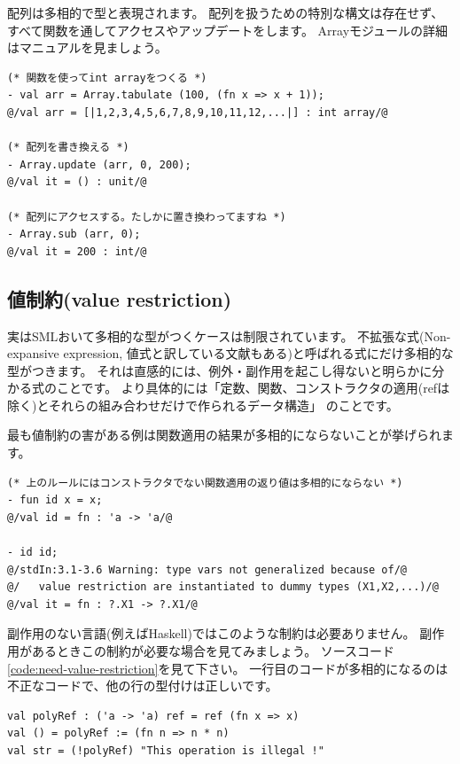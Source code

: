 \documentclass[11pt,a4paper]{jarticle}
\begin{document}
配列は多相的で型と表現されます。
配列を扱うための特別な構文は存在せず、
すべて関数を通してアクセスやアップデートをします。
Arrayモジュールの詳細はマニュアルを見ましょう\cite{sml-libs}。

\begin{lstlisting}[caption=配列の扱い,label=code:array]
(* 関数を使ってint arrayをつくる *)
- val arr = Array.tabulate (100, (fn x => x + 1));
@/val arr = [|1,2,3,4,5,6,7,8,9,10,11,12,...|] : int array/@

(* 配列を書き換える *)
- Array.update (arr, 0, 200);
@/val it = () : unit/@

(* 配列にアクセスする。たしかに置き換わってますね *)
- Array.sub (arr, 0);
@/val it = 200 : int/@
\end{lstlisting}

\subsection{値制約(value restriction)}

実はSMLおいて多相的な型がつくケースは制限されています。
不拡張な式(Non-expansive expression, 値式と訳している文献もある)と呼ばれる式にだけ多相的な型がつきます。
それは直感的には、例外・副作用を起こし得ないと明らかに分かる式のことです。
より具体的には「定数、関数、コンストラクタの適用(refは除く)とそれらの組み合わせだけで作られるデータ構造」
のことです。

最も値制約の害がある例は関数適用の結果が多相的にならないことが挙げられます。

\begin{lstlisting}[caption=値制約,label=code:value-description]
(* 上のルールにはコンストラクタでない関数適用の返り値は多相的にならない *)
- fun id x = x;
@/val id = fn : 'a -> 'a/@

- id id;
@/stdIn:3.1-3.6 Warning: type vars not generalized because of/@
@/   value restriction are instantiated to dummy types (X1,X2,...)/@
@/val it = fn : ?.X1 -> ?.X1/@
\end{lstlisting}

副作用のない言語(例えばHaskell)ではこのような制約は必要ありません。
副作用があるときこの制約が必要な場合を見てみましょう。
ソースコード\ref{code:need-value-restriction}を見て下さい。
一行目のコードが多相的になるのは不正なコードで、他の行の型付けは正しいです。

\begin{lstlisting}[caption=値制約が必要なケース(不正なコード、動かない),label=code:need-value-restriction]
val polyRef : ('a -> 'a) ref = ref (fn x => x)
val () = polyRef := (fn n => n * n)
val str = (!polyRef) "This operation is illegal !"
\end{lstlisting}
\end{document}
